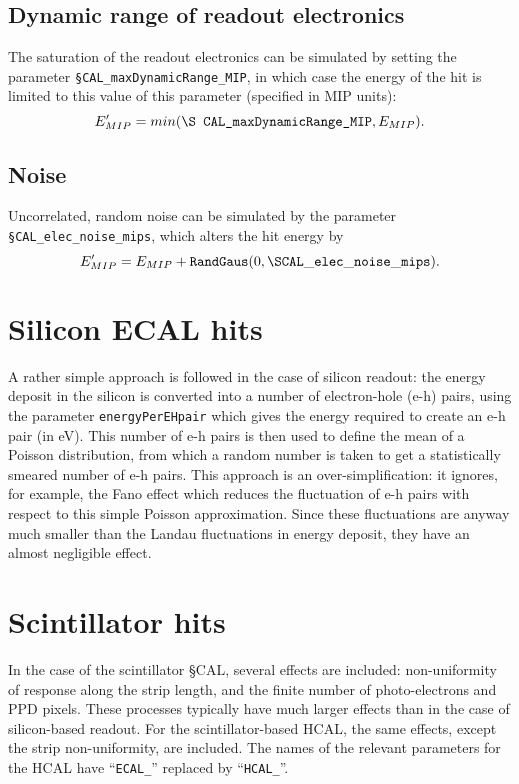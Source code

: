 \documentclass[12pt]{article} %
\begin{document}
\subsection{Dynamic range of readout electronics}
The saturation of the readout electronics can be simulated by setting the parameter {\tt \S CAL\_maxDynamicRange\_MIP},
in which case the energy of the hit is limited to this value of this parameter (specified in MIP units):
\begin{equation*}
E'_{MIP} = min ( \text{\tt \S CAL\_maxDynamicRange\_MIP}, E_{MIP} ).
\end{equation*}

\subsection{Noise}
Uncorrelated, random noise can be simulated by the parameter {\tt \S CAL\_elec\_noise\_mips}, which
alters the hit energy by
\begin{equation*}
E'_{MIP} = E_{MIP} + \text{\tt RandGaus} ( 0, {\tt \S CAL\_elec\_noise\_mips} ).
\end{equation*}

\section{Silicon ECAL hits}

A rather simple approach is followed in the case of silicon readout:
the energy deposit in the silicon is converted into a number of electron-hole (e-h) pairs,
using the parameter {\tt energyPerEHpair} which gives the energy required to create an e-h pair (in eV).
This number of e-h pairs is then used to define the mean of a Poisson distribution, from which a random number is taken
to get a statistically smeared number of e-h pairs.
This approach is an over-simplification: it ignores, for example, the Fano
effect which reduces the fluctuation of e-h pairs with respect to this simple Poisson approximation.
Since these fluctuations are anyway much smaller than the Landau fluctuations in energy deposit,
they have an almost negligible effect.

\section{Scintillator hits}
\label{sec:scintdigi}


In the case of the scintillator \S CAL, several effects are included: non-uniformity of response along the strip length,
and the finite number of photo-electrons and PPD pixels.
These processes typically have much larger effects than in the case of silicon-based readout.
For the scintillator-based HCAL, the same effects, except the strip non-uniformity, are included.
The names of the relevant parameters for the HCAL have ``{\tt ECAL\_}'' replaced by ``{\tt HCAL\_}''.
\end{document}
